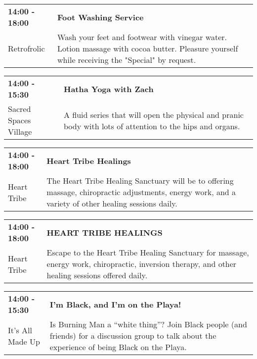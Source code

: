 \begin{tabular}{ p{1in} p{2.2in} }
    \textbf{14:00 - 18:00} & \textbf{Foot Washing Service} \\
    Retrofrolic \newline  & Wash your feet and footwear with vinegar water.  Lotion massage with cocoa butter. Pleasure yourself while receiving the "Special" by request. \\
    \hline 
\end{tabular}
    
\begin{tabular}{ p{1in} p{2.2in} }
    \textbf{14:00 - 15:30} & \textbf{Hatha Yoga with Zach} \\
    Sacred Spaces Village \newline  & A fluid series that will open the physical and pranic body with lots of attention to the hips and organs. \\
    \hline 
\end{tabular}
    
\begin{tabular}{ p{1in} p{2.2in} }
    \textbf{14:00 - 18:00} & \textbf{Heart Tribe Healings} \\
    Heart Tribe \newline  & The Heart Tribe Healing Sanctuary will be to offering massage, chiropractic adjustments, energy work, and a variety of other healing sessions daily. \\
    \hline 
\end{tabular}
    
\begin{tabular}{ p{1in} p{2.2in} }
    \textbf{14:00 - 18:00} & \textbf{HEART TRIBE HEALINGS} \\
    Heart Tribe \newline  & Escape to the Heart Tribe Healing Sanctuary for massage, energy work, chiropractic, inversion therapy, and other healing sessions offered daily. \\
    \hline 
\end{tabular}
    
\begin{tabular}{ p{1in} p{2.2in} }
    \textbf{14:00 - 15:30} & \textbf{I'm Black, and I'm on the Playa!} \\
    It's All Made Up \newline  & Is Burning Man a ``white thing''? Join Black people (and friends) for a discussion group to talk about the experience of being Black on the Playa. \\
    \hline 
\end{tabular}
    
